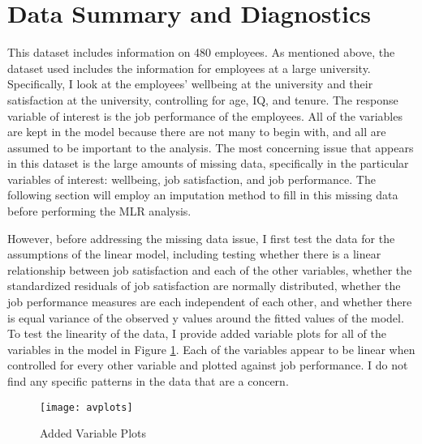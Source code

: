 \documentclass{svproc}
\begin{document}
\section{Data Summary and Diagnostics}

This dataset includes information on 480 employees. As mentioned above, the dataset used includes the information for employees at a large university. Specifically, I look at the employees' wellbeing at the university and their satisfaction at the university, controlling for age, IQ, and tenure. The response variable of interest is the job performance of the employees. All of the variables are kept in the model because there are not many to begin with, and all are assumed to be important to the analysis. The most concerning issue that appears in this dataset is the large amounts of missing data, specifically in the particular variables of interest: wellbeing, job satisfaction, and job performance. The following section will employ an imputation method to fill in this missing data before performing the MLR analysis.

However, before addressing the missing data issue, I first test the data for the assumptions of the linear model, including testing whether there is a linear relationship between job satisfaction and each of the other variables, whether the standardized residuals of job satisfaction are normally distributed, whether the job performance measures are each independent of each other, and whether there is equal variance of the observed y values around the fitted values of the model. To test the linearity of the data, I provide added variable plots for all of the variables in the model in Figure \ref{avplots}. Each of the variables appear to be linear when controlled for every other variable and plotted against job performance. I do not find any specific patterns in the data that are a concern. 

\begin{figure}
\begin{center}
\caption{Added Variable Plots}
\texttt{[image: avplots]}
\label{avplots}
\smallskip
\end{center}
\end{figure}
\end{document}

